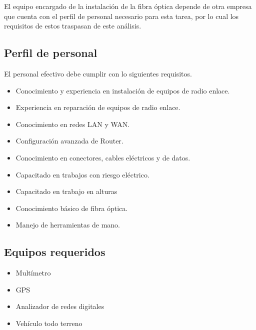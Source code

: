 \documentclass[12pt,a4paper]{book}
\begin{document}
El equipo encargado de la instalación de la fibra óptica depende de otra empresa que cuenta con el perfil de personal necesario para esta tarea, por lo cual los requisitos de estos traspasan de este análisis.

\subsection{Perfil de personal}\label{subsec_personal}
El personal efectivo debe cumplir con lo siguientes requisitos.

\begin{itemize}
\item Conocimiento y experiencia en instalación de equipos de radio enlace.
\item Experiencia en reparación de equipos de radio enlace.
\item Conocimiento en redes LAN y WAN.
\item Configuración avanzada de Router.
\item Conocimiento en conectores, cables eléctricos y de datos.
\item Capacitado en trabajos con riesgo eléctrico.
\item Capacitado en trabajo en alturas
\item Conocimiento básico de fibra óptica.
\item Manejo de herramientas de mano.
\end{itemize}

\subsection{Equipos requeridos}
\begin{itemize}
\item Multímetro
\item GPS
\item Analizador de redes digitales
\item Vehículo todo terreno
\end{itemize}
\end{document}

